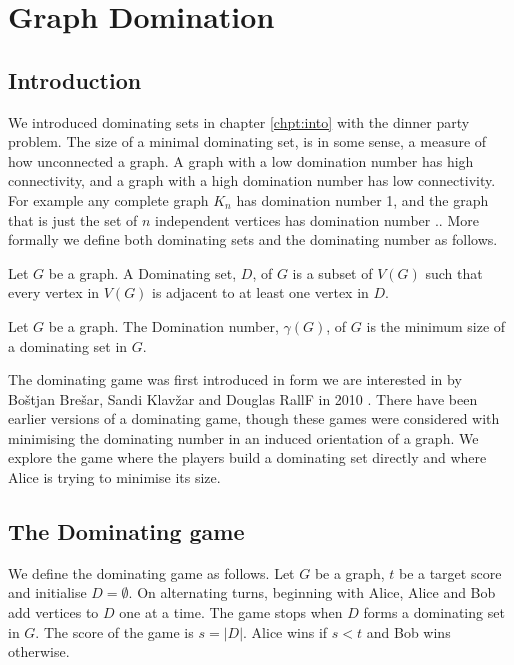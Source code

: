 \chapter{Graph Domination}\label{chpt:domSet}

\section{Introduction}

We introduced dominating sets in chapter \ref{chpt:into} with the dinner party problem. The size of a minimal dominating set, is in some sense, a measure of how unconnected a graph. A graph with a low domination number has high connectivity, and a graph with a high domination number has low connectivity. For example any complete graph $K_n$ has domination number 1, and the graph that is just the set of $n$ independent vertices has domination number $.$. More formally we define  both dominating sets and the dominating number as follows.

\begin{definition}
    Let $G$ be a graph. A Dominating set, $D$, of $G$ is a subset of $V(G)$ such that every vertex in $V(G)$ is adjacent to at least one vertex in $D$.
\end{definition} 
\begin{definition}
    Let $G$ be a graph. The Domination number, $\gamma(G)$, of $G$ is the minimum size of a dominating set in $G$.
\end{definition}

 The dominating game was first introduced in form we are interested in by Bo\v{s}tjan Bre\v{s}ar, Sandi Klav\v{z}ar and Douglas RallF in 2010 \cite{BrKlRa2010}. There have been earlier versions of a dominating game, though these games were considered with minimising the dominating number in an induced orientation of a graph. We explore the game where the players build a dominating set directly and where Alice is trying to minimise its size. 


\section{The Dominating game}

We define the dominating game as follows. Let $G$ be a graph, $t$ be a target score and initialise $D=\emptyset$. On alternating turns, beginning with Alice, Alice and Bob add vertices to $D$ one at a time. The game stops when $D$ forms a dominating set in $G$. The score of the game is $s=|D|$. Alice wins if $s<t$ and Bob wins otherwise. %

